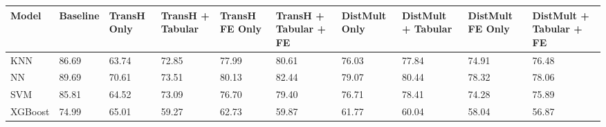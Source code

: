\begin{tabular}{llllllllll}
\toprule
Model & Baseline & TransH Only & TransH + Tabular & TransH FE Only & TransH + Tabular + FE & DistMult Only & DistMult + Tabular & DistMult FE Only & DistMult + Tabular + FE \\
\midrule
KNN & 86.69 & 63.74 & 72.85 & 77.99 & 80.61 & 76.03 & 77.84 & 74.91 & 76.48 \\
NN & 89.69 & 70.61 & 73.51 & 80.13 & 82.44 & 79.07 & 80.44 & 78.32 & 78.06 \\
SVM & 85.81 & 64.52 & 73.09 & 76.70 & 79.40 & 76.71 & 78.41 & 74.28 & 75.89 \\
XGBoost & 74.99 & 65.01 & 59.27 & 62.73 & 59.87 & 61.77 & 60.04 & 58.04 & 56.87 \\
\bottomrule
\end{tabular}
